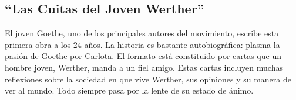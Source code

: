 \documentclass{article}
\begin{document}
\subsection{``Las Cuitas del Joven Werther''}

El joven Goethe, uno de los principales autores del movimiento, escribe esta primera obra a los 24 años. La historia es bastante autobiográfica: plasma la pasión de Goethe por Carlota. El formato está constituido por cartas que un hombre joven, Werther, manda a un fiel amigo. Estas cartas incluyen muchas reflexiones sobre la sociedad en que vive Werther, sus opiniones y su manera de ver al mundo. Todo siempre pasa por la lente de su
estado de ánimo.
\end{document}
